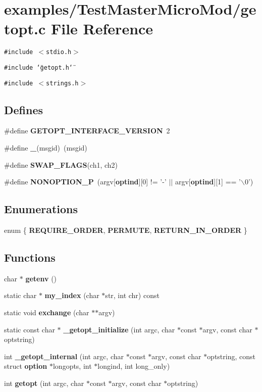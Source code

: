 \section{examples/Test\-Master\-Micro\-Mod/getopt.c File Reference}
\label{TestMasterMicroMod_2getopt_8c}
{\tt \#include $<$stdio.h$>$}\par
{\tt \#include \char`\"{}getopt.h\char`\"{}}\par
{\tt \#include $<$strings.h$>$}\par
\subsection*{Defines}
\begin{CompactItemize}
\item 
\#define {\bf GETOPT\_\-INTERFACE\_\-VERSION}~2
\item 
\#define {\bf \_\-}(msgid)~(msgid)
\item 
\#define {\bf SWAP\_\-FLAGS}(ch1, ch2)
\item 
\#define {\bf NONOPTION\_\-P}~(argv[{\bf optind}][0] != '-' $|$$|$ argv[{\bf optind}][1] == '$\backslash$0')
\end{CompactItemize}
\subsection*{Enumerations}
\begin{CompactItemize}
\item 
enum \{ {\bf REQUIRE\_\-ORDER}, 
{\bf PERMUTE}, 
{\bf RETURN\_\-IN\_\-ORDER}
 \}
\end{CompactItemize}
\subsection*{Functions}
\begin{CompactItemize}
\item 
char $\ast$ {\bf getenv} ()
\item 
static char $\ast$ {\bf my\_\-index} (char $\ast$str, int chr) const
\item 
static void {\bf exchange} (char $\ast$$\ast$argv)
\item 
static const char $\ast$ {\bf \_\-getopt\_\-initialize} (int argc, char $\ast$const $\ast$argv, const char $\ast$optstring)
\item 
int {\bf \_\-getopt\_\-internal} (int argc, char $\ast$const $\ast$argv, const char $\ast$optstring, const struct {\bf option} $\ast$longopts, int $\ast$longind, int long\_\-only)
\item 
int {\bf getopt} (int argc, char $\ast$const $\ast$argv, const char $\ast$optstring)
\end{CompactItemize}
